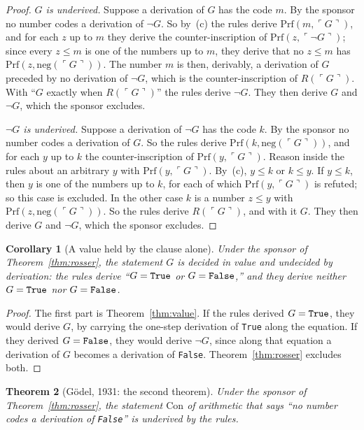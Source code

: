 \documentclass[11pt]{article}
\newtheorem{theorem}{Theorem}[section]
\newtheorem{corollary}[theorem]{Corollary}
\theoremstyle{definition}
\theoremstyle{remark}
\DeclareRobustCommand{\lean}[1]{{\renewcommand{\_}{\textunderscore\allowbreak}\texttt{#1}}}
\newcommand{\True}{\lean{True}}
\newcommand{\False}{\lean{False}}
\begin{document}
\begin{proof}
\emph{$G$ is underived.} Suppose a derivation of $G$ has the code $m$. By the sponsor no number codes a derivation of $\neg G$. So by~(c) the rules derive $\mathrm{Prf}(m,\ulcorner G\urcorner)$, and for each $z$ up to $m$ they derive the counter-inscription of $\mathrm{Prf}(z,\ulcorner\neg G\urcorner)$; since every $z\le m$ is one of the numbers up to $m$, they derive that no $z\le m$ has $\mathrm{Prf}(z,\mathrm{neg}(\ulcorner G\urcorner))$. The number $m$ is then, derivably, a derivation of $G$ preceded by no derivation of $\neg G$, which is the counter-inscription of $R(\ulcorner G\urcorner)$. With ``$G$ exactly when $R(\ulcorner G\urcorner)$'' the rules derive $\neg G$. They then derive $G$ and $\neg G$, which the sponsor excludes.

\emph{$\neg G$ is underived.} Suppose a derivation of $\neg G$ has the code $k$. By the sponsor no number codes a derivation of $G$. So the rules derive $\mathrm{Prf}(k,\mathrm{neg}(\ulcorner G\urcorner))$, and for each $y$ up to $k$ the counter-inscription of $\mathrm{Prf}(y,\ulcorner G\urcorner)$. Reason inside the rules about an arbitrary $y$ with $\mathrm{Prf}(y,\ulcorner G\urcorner)$. By~(c), $y\le k$ or $k\le y$. If $y\le k$, then $y$ is one of the numbers up to $k$, for each of which $\mathrm{Prf}(y,\ulcorner G\urcorner)$ is refuted; so this case is excluded. In the other case $k$ is a number $z\le y$ with $\mathrm{Prf}(z,\mathrm{neg}(\ulcorner G\urcorner))$. So the rules derive $R(\ulcorner G\urcorner)$, and with it $G$. They then derive $G$ and $\neg G$, which the sponsor excludes.
\end{proof}

\begin{corollary}[A value held by the clause alone]\label{cor:alone}
Under the sponsor of Theorem~\ref{thm:rosser}, the statement $G$ is decided in value and undecided by derivation: the rules derive ``$G=\True$ or $G=\False$,'' and they derive neither $G=\True$ nor $G=\False$.
\end{corollary}

\begin{proof}
The first part is Theorem~\ref{thm:value}. If the rules derived $G=\True$, they would derive $G$, by carrying the one-step derivation of \True{} along the equation. If they derived $G=\False$, they would derive $\neg G$, since along that equation a derivation of $G$ becomes a derivation of \False. Theorem~\ref{thm:rosser} excludes both.
\end{proof}

\begin{theorem}[G\"odel, 1931: the second theorem]\label{thm:second}
Under the sponsor of Theorem~\ref{thm:rosser}, the statement $\mathrm{Con}$ of arithmetic that says ``no number codes a derivation of \False'' is underived by the rules.
\end{theorem}
\end{document}
